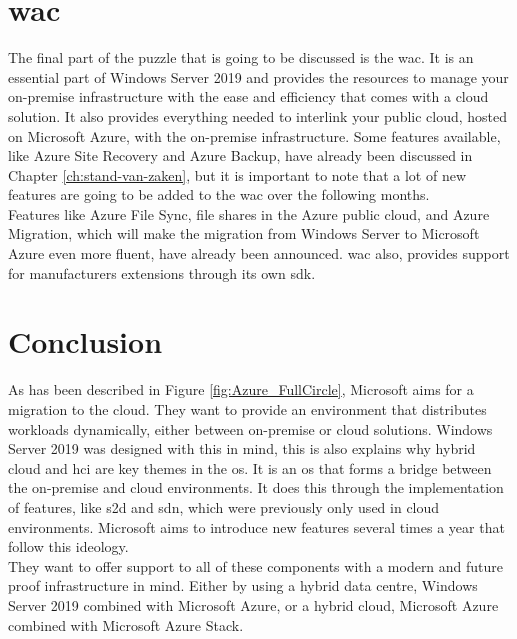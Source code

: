 \section{\acrfull{wac}}
The final part of the puzzle that is going to be discussed is the \acrlong{wac}. 
It is an essential part of Windows Server 2019 and provides the resources to manage your on-premise infrastructure with the ease and efficiency that comes with a cloud solution. 
It also provides everything needed to interlink your public cloud, hosted on Microsoft Azure, with the on-premise infrastructure. 
Some features available, like Azure Site Recovery and Azure Backup, have already been discussed in Chapter \ref{ch:stand-van-zaken}, but it is important to note that a lot of new features are going to be added to the \acrlong{wac} over the following months.\autocite{Singh2019} 
\\
Features like Azure File Sync, file shares in the Azure public cloud, and Azure Migration, which will make the migration from Windows Server to Microsoft Azure even more fluent, have already been announced. 
\acrlong{wac} also, provides support for manufacturers extensions through its own \acrfull{sdk}. 	

\section{Conclusion}
As has been described in Figure \ref{fig:Azure_FullCircle}, Microsoft aims for a migration to the cloud. 
They want to provide an environment that distributes workloads dynamically, either between on-premise or cloud solutions. 
Windows Server 2019 was designed with this in mind, this is also explains why hybrid cloud and \acrshort{hci} are key themes in the \acrshort{os}. 
It is an \acrshort{os} that forms a bridge between the on-premise and cloud environments. 
It does this through the implementation of features, like \acrfull{s2d} and \acrfull{sdn}, which were previously only used in cloud environments. 
Microsoft aims to introduce new features several times a year that follow this ideology.
\\
They want to offer support to all of these components with a modern and future proof infrastructure in mind. 
Either by using a hybrid data centre, Windows Server 2019 combined with Microsoft Azure, or a hybrid cloud, Microsoft Azure combined with Microsoft Azure Stack.